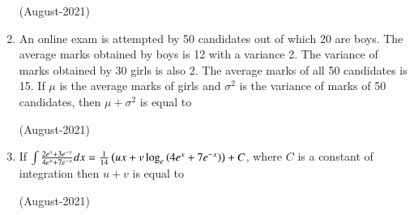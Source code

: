 \documentclass[journal]{IEEEtran}
\begin{document}
\begin{enumerate}
    \hfill (August-2021)
    
    \item An online exam is attempted by 50 candidates out of which 20 are boys. The average marks obtained by boys is 12 with a variance 2. The variance of marks obtained by 30 girls is also 2. The average marks of all 50 candidates is 15. If $\mu$ is the average marks of girls and $\sigma ^2$
 is the variance of marks of 50 candidates, then 
$\mu + \sigma^2$ is equal to

\hfill(August-2021)
\item If $\int \frac{2e^x + 3e^{-x}}{4e^x+ 7e^{-x}}dx = \frac{1}{14} \left(ux + v \log_e \left(4e^x + 7e^{-x}\right)\right) + C$, where $C$ is a constant of integration then $u + v$ is equal to 

\hfill (August-2021)
\end{enumerate}
\end{document}
